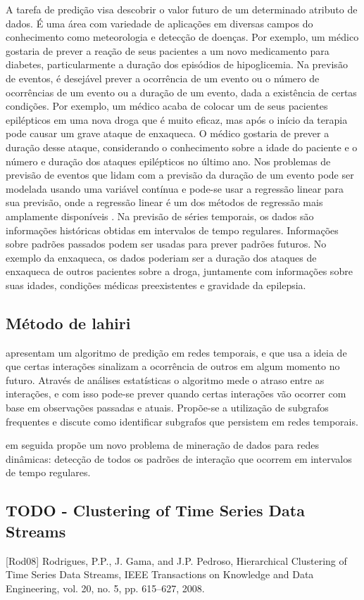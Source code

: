 A tarefa de predição visa descobrir o valor futuro de um determinado atributo de dados. É uma área com variedade de aplicações em diversas campos do conhecimento como meteorologia e detecção de doenças. Por exemplo, um médico gostaria de prever a reação de seus pacientes a um novo medicamento para diabetes, particularmente a duração dos episódios de hipoglicemia.
Na previsão de eventos, é desejável prever a ocorrência de um evento ou o número de ocorrências de um evento ou a duração de um evento, dada a existência de certas condições. Por exemplo, um médico acaba de colocar um de seus pacientes epilépticos em uma nova droga que é muito eficaz, mas após o início da terapia pode causar um grave ataque de enxaqueca. O médico gostaria de prever a duração desse ataque, considerando o conhecimento sobre a idade do paciente e o número e duração dos ataques epilépticos no último ano. Nos problemas de previsão de eventos que lidam com a previsão da duração de um evento pode ser modelada usando uma variável contínua e pode-se usar a regressão linear para sua previsão, onde a regressão linear é um dos métodos de regressão mais amplamente disponíveis \cite{Mitsa:2010}.
Na previsão de séries temporais, os dados são informações históricas obtidas em intervalos de tempo regulares. Informações sobre padrões passados podem ser usadas para prever padrões futuros. No exemplo da enxaqueca, os dados poderiam ser a duração dos ataques de enxaqueca de outros pacientes sobre a droga, juntamente com informações sobre suas idades, condições médicas preexistentes e gravidade da epilepsia.

\subsection{Método de lahiri}
\label{lahiri}
\cite{lahiri2007} apresentam um algoritmo de predição em redes temporais, e que usa a ideia de que certas interações sinalizam a ocorrência de outros em algum momento no futuro. Através de análises estatísticas o algoritmo mede o atraso entre as interações, e com isso pode-se prever quando certas interações vão ocorrer com base em observações passadas e atuais. Propõe-se a utilização de subgrafos frequentes e discute como identificar subgrafos que persistem em redes temporais.

\cite{lahiri2008} em seguida propõe um novo problema de mineração de dados para redes dinâmicas: detecção de todos os padrões de interação que ocorrem em intervalos de tempo regulares.

\subsection{TODO - Clustering of Time Series Data Streams}
[Rod08]
Rodrigues, P.P., J. Gama, and J.P. Pedroso, Hierarchical Clustering of Time Series Data Streams, IEEE Transactions on Knowledge and Data Engineering, vol. 20, no. 5, pp. 615–627, 2008.

